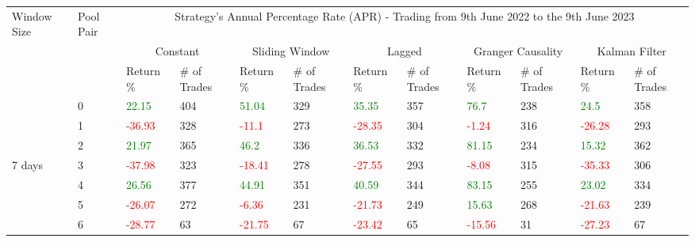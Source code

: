 \begin{table}[!htb]
    \centering
    \begin{adjustwidth}{-0.8in}{-0.9in}
        \begin{tabular}{|p{4em}|p{2em}|p{3em}|p{3em}|p{3em}|p{3em}|p{3em}|p{3em}|p{3em}|p{3em}|p{3em}|p{3em}|}\hline
            Window Size & Pool Pair & \multicolumn{10}{|c|}{Strategy's Annual Percentage Rate (APR) - Trading from 9th June 2022 to the 9th June 2023} \\\cline{3-12}
            &   & \multicolumn{2}{|c|}{Constant} & \multicolumn{2}{|c|}{Sliding Window} & \multicolumn{2}{|c|}{Lagged} & \multicolumn{2}{|c|}{Granger Causality} & \multicolumn{2}{|c|}{Kalman Filter}\\\cline{3-12}
            & & Return \% & \# of Trades & Return \% & \# of Trades & Return \% & \# of Trades & Return \% & \# of Trades & Return \% & \# of Trades\\\hline

            & 0 & \textcolor{green}{22.15} & 404 & \textcolor{green}{51.04} & 329 & \textcolor{green}{35.35} & 357 & \textcolor{green}{76.7} & 238 & \textcolor{green}{24.5} & 358\\\cline{3-12}
            & 1 & \textcolor{red}{-36.93} & 328 & \textcolor{red}{-11.1} & 273 & \textcolor{red}{-28.35} & 304 & \textcolor{red}{-1.24} & 316 & \textcolor{red}{-26.28} & 293\\\cline{3-12}
            & 2 & \textcolor{green}{21.97} & 365 & \textcolor{green}{46.2} & 336 & \textcolor{green}{36.53} & 332 & \textcolor{green}{81.15} & 234 & \textcolor{green}{15.32} & 362\\\cline{3-12}
            7 days & 3 & \textcolor{red}{-37.98} & 323 & \textcolor{red}{-18.41} & 278 & \textcolor{red}{-27.55} & 293 & \textcolor{red}{-8.08} & 315 & \textcolor{red}{-35.33} & 306\\\cline{3-12}
            & 4 & \textcolor{green}{26.56} & 377 & \textcolor{green}{44.91} & 351 & \textcolor{green}{40.59} & 344 & \textcolor{green}{83.15} & 255 & \textcolor{green}{23.02} & 334\\\cline{3-12}
            & 5 & \textcolor{red}{-26.07} & 272 & \textcolor{red}{-6.36} & 231 & \textcolor{red}{-21.73} & 249 & \textcolor{green}{15.63} & 268 & \textcolor{red}{-21.63} & 239\\\cline{3-12}
            & 6 & \textcolor{red}{-28.77} & 63 & \textcolor{red}{-21.75} & 67 & \textcolor{red}{-23.42} & 65 & \textcolor{red}{-15.56} & 31 & \textcolor{red}{-27.23} & 67\\\hline\hline


\end{tabular}
\end{adjustwidth}
\end{table}
